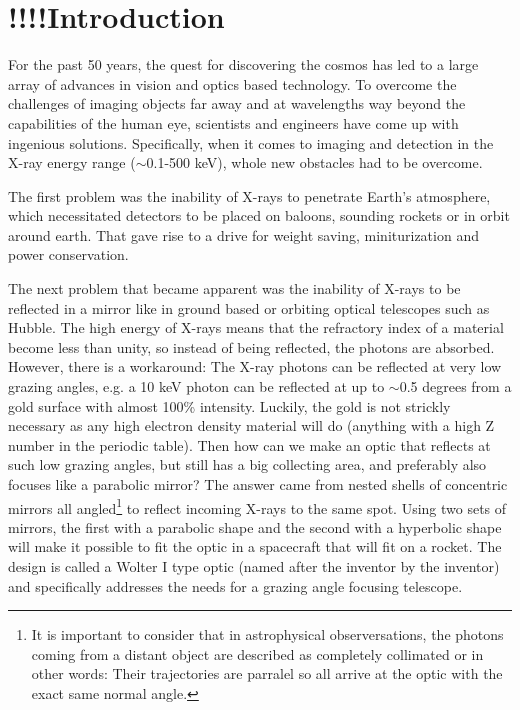 \chapter{!!!!Introduction}
For the past 50 years, the quest for discovering the cosmos has led to a large array of advances in vision and optics based technology. To overcome the challenges of imaging objects far away and at wavelengths way beyond the capabilities of the human eye, scientists and engineers have come up with ingenious solutions. Specifically, when it comes to imaging and detection in the X-ray energy range ($\sim$0.1-500 keV), whole new obstacles had to be overcome.

The first problem was the inability of X-rays to penetrate Earth's atmosphere, which necessitated detectors to be placed on baloons, sounding rockets or in orbit around earth. That gave rise to a drive for weight saving, miniturization and power conservation.

The next problem that became apparent was the inability of X-rays to be reflected in a mirror like in ground based or orbiting optical telescopes such as Hubble. The high energy of X-rays means that the refractory index of a material become less than unity, so instead of being reflected, the photons are absorbed. However, there is a workaround: The X-ray photons can be reflected at very low grazing angles, e.g. a 10 keV photon can be reflected at up to $\sim$0.5 degrees from a gold surface with almost 100\% intensity. Luckily, the gold is not strickly necessary as any high electron density material will do (anything with a high Z number in the periodic table). Then how can we make an optic that reflects at such low grazing angles, but still has a big collecting area, and preferably also focuses like a parabolic mirror? The answer came from nested shells of concentric mirrors all angled\footnote{It is important to consider that in astrophysical observersations, the photons coming from a distant object are described as completely collimated or in other words: Their trajectories are parralel so all arrive at the optic with the exact same normal angle.} to reflect incoming X-rays to the same spot. Using two sets of mirrors, the first with a parabolic shape and the second with a hyperbolic shape will make it possible to fit the optic in a spacecraft that will fit on a rocket. The design is called a Wolter I type optic (named after the inventor by the inventor) and specifically addresses the needs for a grazing angle focusing telescope.

